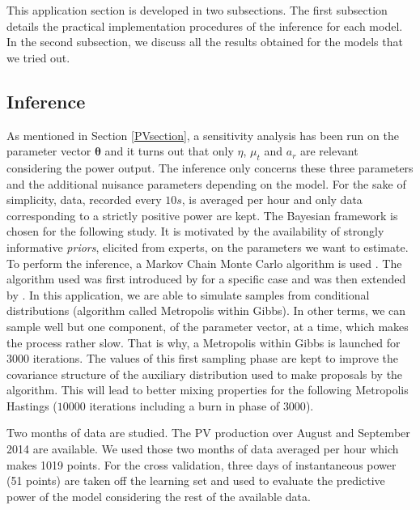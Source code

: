 \documentclass[soumission]{jsfds}
\begin{document}
This application section is developed in two subsections. The first subsection details the practical implementation procedures of the inference for each model. In the second subsection, we discuss all the results obtained for the models that we tried out.\newline

\subsection{Inference \label{Inference}}
As mentioned in Section \ref{PVsection}, a sensitivity analysis has been run on the parameter vector $\boldsymbol{\theta}$ and it turns out that only $\eta$, $\mu_t$ and $a_r$ are relevant considering the power output. The inference only concerns these three parameters and the additional nuisance parameters depending on the model. For the sake of simplicity, data, recorded every $10s$, is averaged per hour and only data corresponding to a strictly positive power are kept. The Bayesian framework is chosen for the following study. It is motivated by the availability of strongly informative \textit{priors}, elicited from experts, on the parameters we want to estimate. To perform the inference, a Markov Chain Monte Carlo algorithm is used \citep{robert1996}. The algorithm used was first introduced by
\citet{metropolis1953} for a specific case and was then extended by \citet{Hastings1970}. In this application, we are able to simulate samples
from conditional distributions (algorithm called Metropolis within Gibbs). In other terms, we can sample well but one component, of the parameter vector, 
at a time, which makes the process rather slow. That is why, a Metropolis within Gibbs is launched for $3000$ iterations.
The values of this first sampling phase are kept to improve the covariance structure of the auxiliary distribution used to make proposals by the algorithm.
This will lead to better mixing properties for the following Metropolis Hastings ($10000$ iterations including a burn in phase of $3000$).\newline

Two months of data are studied. The PV production over August and September 2014 are available. We used those two months of data averaged per hour which makes 1019 points. For the cross validation, three days of instantaneous power (51 points) are taken off the learning set and used to evaluate the predictive power of the model considering the rest of the available data. \newline
\end{document}
